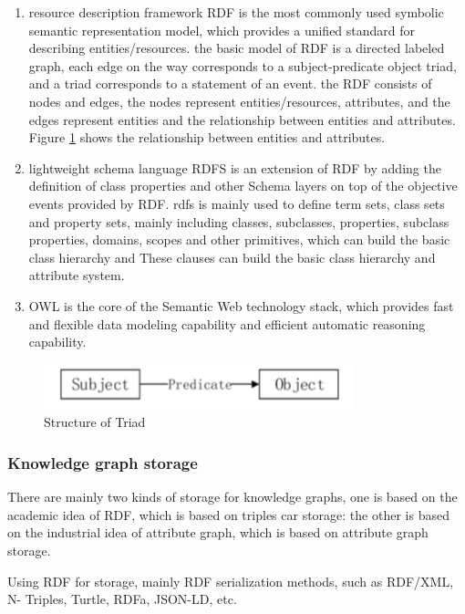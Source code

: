 \documentclass[11pt,en]{elegantpaper}
\begin{document}
\begin{enumerate}
\item resource description framework RDF is the most commonly used symbolic semantic representation model, which provides a unified standard for describing entities/resources. the basic model of RDF is a directed labeled graph, each edge on the way corresponds to a subject-predicate object triad, and a triad corresponds to a statement of an event. the RDF consists of nodes and edges, the nodes represent entities/resources, attributes, and the edges represent entities and the relationship between entities and attributes. Figure \ref{triad1} shows the relationship between entities and attributes.
\item lightweight schema language RDFS is an extension of RDF by adding the definition of class properties and other Schema layers on top of the objective events provided by RDF. rdfs is mainly used to define term sets, class sets and property sets, mainly including classes, subclasses, properties, subclass properties, domains, scopes and other primitives, which can build the basic class hierarchy and These clauses can build the basic class hierarchy and attribute system.
\item OWL is the core of the Semantic Web technology stack, which provides fast and flexible data modeling capability and efficient automatic reasoning capability.
\end{enumerate}

\begin{figure}[h]
\includegraphics[width=0.8\textwidth]{./image/f01.png}
\caption{Structure of Triad}
\label{triad1}
\end{figure}

\subsubsection{Knowledge graph storage}
There are mainly two kinds of storage for knowledge graphs, one is based on the academic idea of RDF, which is based on triples car storage: the other is based on the industrial idea of attribute graph, which is based on attribute graph storage.

Using RDF for storage, mainly RDF serialization methods, such as RDF/XML, N- Triples, Turtle, RDFa, JSON-LD, etc.
\end{document}
